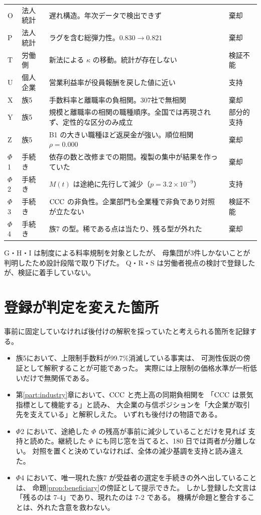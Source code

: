 \begin{longtable}{@{}ll>{\raggedright\arraybackslash}p{}l@{}}
O & 法人統計 & 遅れ構造。年次データで検出できず & 棄却 \\
P & 法人統計 & ラグを含む総弾力性。$0.830\to0.821$ & 棄却 \\
T & 労働側 & 新法による $\kappa$ の移動。統計が存在しない & 検証不能 \\
U & 個人企業 & 営業利益率が役員報酬を戻した値に近い & 支持 \\
X & 族5 & 手数料率と離職率の負相関。307社で無相関 & 棄却 \\
Y & 族5 & 規模と離職率の相関の職種順序。全国では再現されず、定性的な区分のみ成立 & 部分的支持 \\
Z & 族5 & B1 の大きい職種ほど返戻金が強い。順位相関 $\rho=0.000$ & 棄却 \\
$\Phi$1 & 手続き & 依存の数と改修までの期間。複製の集中が結果を作っていた & 棄却 \\
$\Phi$2 & 手続き & $M(t)$ は途絶に先行して減少（$p=3.2\times10^{-9}$） & 支持 \\
$\Phi$3 & 手続き & $\mathrm{CCC}$ の非負性。企業部門も全業種で非負であり対照が立たない & 検証不能 \\
$\Phi$4 & 手続き & 族7 の型。稀である点は当たり、残る型が外れた & 棄却 \\
\end{longtable}

G・H・I は制度による料率規制を対象としたが、
母集団が3件しかないことが判明したため設計段階で取り下げた。
Q・R・S は労働者視点の検討で登録したが、検証に着手していない。

\section{登録が判定を変えた箇所}

事前に固定していなければ後付けの解釈を採っていたと考えられる箇所を記録する。

\begin{itemize}
\item 族5において、上限制手数料が99.7\%消滅している事実は、
可測性仮説の傍証として解釈することが可能であった。
実際には上限制の価格水準が一桁低いだけで無関係である。

\item 第\ref{part:industry}章において、$\mathrm{CCC}$ と売上高の同期負相関を
「$\mathrm{CCC}$ は景気指標として機能する」と読み、
大企業の与信ポジションを「大企業が取引先を支えている」と解釈しえた。
いずれも後付けの物語である。

\item $\Phi$2 において、途絶した $\Phi$ の残高が事前に減少していることだけを見れば
支持と読めた。継続した $\Phi$ にも同じ窓を当てると、180 日では両者が分離しない。
対照を置くと決めていなければ、全体の減少基調を支持と読み違えた。

\item $\Phi$4 において、唯一現れた族7 が受益者の選定を手続きの外へ出していることは、
命題\ref{prop:beneficiary}の傍証として提示できた。
しかし登録した文言は「残るのは 7-4」であり、現れたのは 7-2 である。
機構が命題と整合することは、外れた含意を救わない。
\end{itemize}

